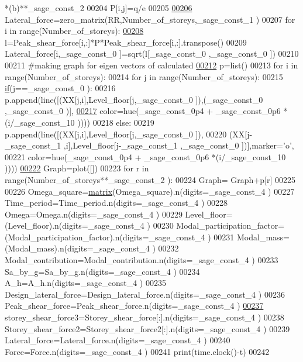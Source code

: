 \begin{DoxyCode}
      *(b)**\_sage\_const\_2 
00204         P[i,j]=q/e
00205     
\hypertarget{main_8sage_8py_source_l00206}{}\hyperlink{namespacemain_a712447a841ce148ad2d1210e57dc7894}{00206} Lateral\_force=zero\_matrix(RR,Number\_of\_storeys,\_sage\_const\_1 )
00207 \textcolor{keywordflow}{for} i \textcolor{keywordflow}{in} range(Number\_of\_storeys):
\hypertarget{main_8sage_8py_source_l00208}{}\hyperlink{namespacemain_a027916efc284622d928c1d8383917f6d}{00208}     l=Peak\_shear\_force[i,:]*P*Peak\_shear\_force[i,:].transpose()
00209     Lateral\_force[i,\_sage\_const\_0 ]=sqrt(l[\_sage\_const\_0 ,\_sage\_const\_0 ])
00210 
00211 \textcolor{comment}{#making graph for eigen vectors of calculated}
\hypertarget{main_8sage_8py_source_l00212}{}\hyperlink{namespacemain_ab31fc16b432d2248a6c76c6a18d741d0}{00212} p=list()
00213 \textcolor{keywordflow}{for} i \textcolor{keywordflow}{in} range(Number\_of\_storeys):
00214     \textcolor{keywordflow}{for} j \textcolor{keywordflow}{in} range(Number\_of\_storeys):
00215         \hyperlink{bootstrap_8min_8js_ac2d69f5011896c6ed4a54e0dd36f6334}{if}(j==\_sage\_const\_0 ):
00216             p.append(line([(XX[j,i],Level\_floor[j,\_sage\_const\_0 ]),(\_sage\_const\_0 ,\_sage\_const\_0 )],
\hypertarget{main_8sage_8py_source_l00217}{}\hyperlink{namespacemain_aeabbf69db1809807f065c2d1e9a62567}{00217}             color=hue(\_sage\_const\_0p4  + \_sage\_const\_0p6 *(i/\_sage\_const\_10 ))))
00218         \textcolor{keywordflow}{else}:
00219             p.append(line([(XX[j,i],Level\_floor[j,\_sage\_const\_0 ]),
00220             (XX[j-\_sage\_const\_1 ,i],Level\_floor[j-\_sage\_const\_1 ,\_sage\_const\_0 ])],marker=\textcolor{stringliteral}{'o'},
00221             color=hue(\_sage\_const\_0p4  + \_sage\_const\_0p6 *(i/\_sage\_const\_10 ))))
\hypertarget{main_8sage_8py_source_l00222}{}\hyperlink{namespacemain_ad40f6b3437e83a0385177ac65a317b97}{00222} Graph=plot([])
00223 \textcolor{keywordflow}{for} r \textcolor{keywordflow}{in} range(Number\_of\_storeys**\_sage\_const\_2 ):
00224     Graph= Graph+p[r]
00225 
00226 Omega\_square=\hyperlink{namespacecivilsage_1_1views_a8b58c93a9c82e84143c43dafaa744a4b}{matrix}(Omega\_square).n(digits=\_sage\_const\_4 )
00227 Time\_period=Time\_period.n(digits=\_sage\_const\_4 )
00228 Omega=Omega.n(digits=\_sage\_const\_4 )
00229 Level\_floor=(Level\_floor).n(digits=\_sage\_const\_4 )
00230 Modal\_participation\_factor=(Modal\_participation\_factor).n(digits=\_sage\_const\_4 )
00231 Modal\_mass=(Modal\_mass).n(digits=\_sage\_const\_4 )
00232 Modal\_contribution=Modal\_contribution.n(digits=\_sage\_const\_4 )
00233 Sa\_by\_g=Sa\_by\_g.n(digits=\_sage\_const\_4 )
00234 A\_h=A\_h.n(digits=\_sage\_const\_4 )
00235 Design\_lateral\_force=Design\_lateral\_force.n(digits=\_sage\_const\_4 )
00236 Peak\_shear\_force=Peak\_shear\_force.n(digits=\_sage\_const\_4 )
\hypertarget{main_8sage_8py_source_l00237}{}\hyperlink{namespacemain_aa741e0bac28acc57bb99fbe2b14205c7}{00237} storey\_shear\_force3=Storey\_shear\_force[:].n(digits=\_sage\_const\_4 )
00238 Storey\_shear\_force2=Storey\_shear\_force2[:].n(digits=\_sage\_const\_4 )
00239 Lateral\_force=Lateral\_force.n(digits=\_sage\_const\_4 )
00240 Force=Force.n(digits=\_sage\_const\_4 )
00241 print(time.clock()-t)
00242 
\end{DoxyCode}
